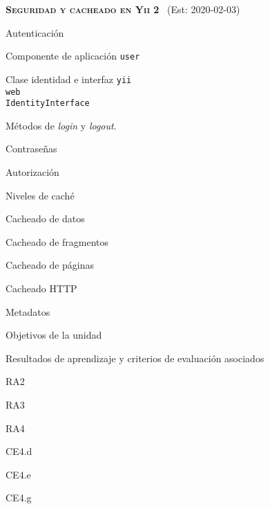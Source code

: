\begin{longenum}
\begin{longenum}
\begin{longenum}
\begin{longenum}
\begin{longenum}
                \end{longenum}
            \end{longenum}
        \end{longenum}
    \end{longenum}
    \item \textbf{\textsc{Seguridad y cacheado en Yii 2}} \ (Est: 2020-02-03)
    \begin{longenum}
        \item Autenticación
        \begin{longenum}
            \item Componente de aplicación \texttt{user}
            \item Clase identidad e interfaz \texttt{yii\\web\\IdentityInterface}
            \item Métodos de \textit{login} y \textit{logout}.
        \end{longenum}
        \item Contraseñas
        \item Autorización
        \item Niveles de caché
        \begin{longenum}
            \item Cacheado de datos
            \item Cacheado de fragmentos
            \item Cacheado de páginas
            \item Cacheado HTTP
        \end{longenum}
        \item Metadatos
        \begin{longenum}
            \item Objetivos de la unidad
            \item Resultados de aprendizaje y criterios de evaluación asociados
            \begin{longenum}
                \item RA2
                \item RA3
                \item RA4
                \begin{longenum}
                    \item CE4.d
                    \item CE4.e
                    \item CE4.g
                \end{longenum}

\end{longenum}
\end{longenum}
\end{longenum}
\end{longenum}
